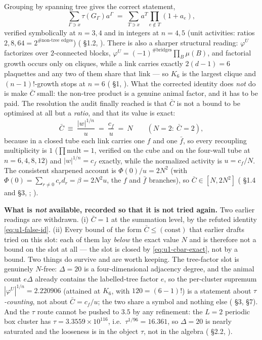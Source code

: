 Grouping by spanning tree gives the correct statement,
\begin{equation}
\sum_{\Gamma\ni x}\tau(G_\Gamma)a^{\Gamma}
\;=\;\sum_{T\ni x}a^{T}\prod_{e\notin T}(1+a_e),
\label{eq:u1-tree-id}
\end{equation}
verified symbolically at $n=3,4$ and in integers at $n=4,5$ (unit activities: ratios
$2,8,64=2^{\#\text{non-tree edges}}$) ( \S1.2, \LT{}). There is also a sharper
structural reading: $\varphi^U$ factorizes over $2$-connected blocks,
$\varphi^U=(-1)^{\#\text{bridges}}\prod_B\mu(B)$, and factorial growth occurs only on cliques,
while a link carries exactly $2(d-1)=6$ plaquettes and any two of them share that link --- so
$K_6$ is the largest clique and $(n-1)!$-growth stops at $n=6$
( \S1, \LT{}). What the corrected identity does \emph{not} do is make
$\bar C$ small: the non-tree product is a genuine animal factor, and it has to be paid. The
resolution the audit finally reached is that $\bar C$ is not a bound to be optimised at all but a
\emph{ratio}, and that its value is exact:
\begin{equation}
\bar C\ \equiv\ \frac{|w|^{1/n}}{u}\ =\ \frac{c_f}{u}\ =\ N
\qquad(N=2:\ \bar C=2),
\label{eq:u1-cbar-exact}
\end{equation}
because in a closed tube each link carries one $f$ and one $\bar f$, so every recoupling
multiplicity is $1$ ($\prod\mathrm{mult}=1$, verified on the cube and on the four-wall tube at
$n=6,4,8,12$) and $|w|^{1/n}=c_f$ exactly, while the normalized activity is $u=c_f/N$. The
consistent sharpened account is $\Phi(0)/u=2N^2$ (with $\Phi(0)=\sum_{r\ne0}c_rd_r=\beta=2N^2u$,
the $f$ and $\bar f$ branches), so $\bar C\in[N,2N^2]$
( \S1.4 and \S3, \LT{}; ).

\begin{qbox}
\textbf{What is \emph{not} available, recorded so that it is not tried again.} Two earlier
readings are withdrawn. (i) $\bar C=1$ at the summation level, by the refuted identity
\eqref{eq:u1-false-id}. (ii) Every bound of the form $\bar C\le(\text{const})$ that earlier drafts
tried on this slot: each of them lay \emph{below} the exact value $N$ and is therefore not a bound
on the slot at all --- the slot is closed by \eqref{eq:u1-cbar-exact}, not by a bound. Two
things do survive and are worth keeping. The tree-factor slot is genuinely $N$-free:
$\Delta=20$ is a four-dimensional adjacency degree, and the animal count $e\Delta$ already
contains the labelled-tree factor $e$, so the per-cluster supremum $|\varphi^U|^{1/n}=2.220906$
(attained at $K_6$, with $120=(6-1)!$) is a statement about $\tau$\emph{-counting}, not about
$\bar C=c_f/u$; the two share a symbol and nothing else ( \S3, \S7). And the
$\tau$ route cannot be pushed to $3.5$ by any refinement: the $L=2$ periodic box cluster has
$\tau=3.3559\times10^{116}$, i.e.\ $\tau^{1/96}=16.361$, so $\Delta=20$ is nearly saturated and
the looseness is in the object $\tau$, not in the algebra ( \S2.2, \LT{}).
\end{qbox}

